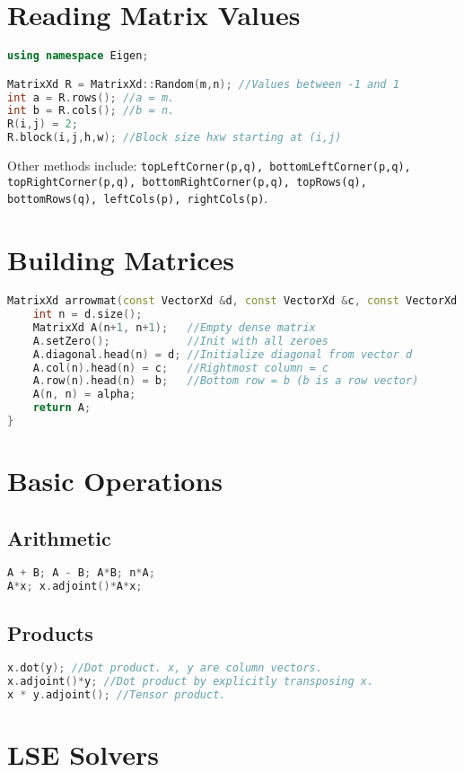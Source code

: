 \documentclass[12pt]{article}
\begin{document}
\section{Reading Matrix Values}
\begin{lstlisting}[language=c++]
using namespace Eigen;

MatrixXd R = MatrixXd::Random(m,n); //Values between -1 and 1
int a = R.rows(); //a = m.
int b = R.cols(); //b = n.
R(i,j) = 2;
R.block(i,j,h,w); //Block size hxw starting at (i,j)
\end{lstlisting}
Other methods include: \texttt{topLeftCorner(p,q), bottomLeftCorner(p,q), topRightCorner(p,q), bottomRightCorner(p,q), topRows(q), bottomRows(q), leftCols(p), rightCols(p)}.
\section{Building Matrices}
\begin{lstlisting}[language=c++]
MatrixXd arrowmat(const VectorXd &d, const VectorXd &c, const VectorXd &b, const double alpha) {
	int n = d.size();
	MatrixXd A(n+1, n+1);	//Empty dense matrix
	A.setZero();			//Init with all zeroes
	A.diagonal.head(n) = d;	//Initialize diagonal from vector d
	A.col(n).head(n) = c;	//Rightmost column = c
	A.row(n).head(n) = b;	//Bottom row = b (b is a row vector)
	A(n, n) = alpha;
	return A;
}
\end{lstlisting}
\section{Basic Operations}
\subsection{Arithmetic}
\begin{lstlisting}[language=c++]
A + B; A - B; A*B; n*A;
A*x; x.adjoint()*A*x;
\end{lstlisting}
\subsection{Products}
\begin{lstlisting}[language=c++]
x.dot(y); //Dot product. x, y are column vectors.
x.adjoint()*y; //Dot product by explicitly transposing x.
x * y.adjoint(); //Tensor product.
\end{lstlisting}
\section{LSE Solvers}
\end{document}
